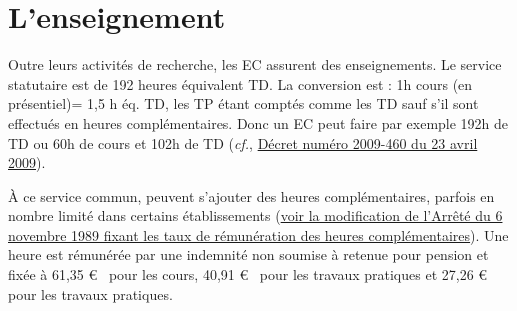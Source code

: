 % 
% 
% 
% 
% 



\section{L'enseignement}
\label{enseignement}

Outre leurs activit\'es de recherche, les EC assurent des enseignements. Le service statutaire est de 192 heures \og \'equivalent TD\fg{}. 
La conversion est : 1h cours (en pr\'esentiel)= 1,5 h \'eq. TD, les TP \'etant compt\'es comme les TD sauf s'il sont effectu\'es en heures compl\'ementaires. Donc un EC peut faire par exemple 192h de TD ou 60h de cours et 102h de TD 
({\em cf.}, \href{http://www.legifrance.gouv.fr/affichTexte.do?cidTexte=JORFTEXT000020552216&dateTexte=&categorieLien=id}{D\'ecret num\'ero 2009-460 du 23 avril 2009}).


\`A ce service commun, peuvent s'ajouter des heures
compl\'ementaires, parfois en nombre limit\'e dans certains \'etablissements (\href{http://www.legifrance.gouv.fr/affichTexte.do?cidTexte=JORFTEXT000000315917&dateTexte=20121122}{voir la modification de l'Arr\^et\'e du 6 novembre 1989 fixant les taux de r\'emun\'eration des heures compl\'ementaires}). Une heure est r\'emun\'er\'ee par une indemnit\'e non soumise \`a retenue pour pension et fix\'ee \`a 61,35 \euro~ pour les cours, 40,91 \euro~ pour les travaux pratiques et 27,26 \euro~ pour les travaux pratiques.

